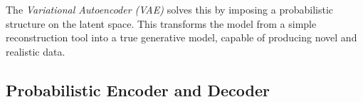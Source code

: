 
The \emph{Variational Autoencoder (VAE)} \citep{kingma2013auto}  solves this by imposing a probabilistic structure on the latent space. This transforms the model from a simple reconstruction tool into a true generative model, capable of producing novel and realistic data.



\subsection{Probabilistic Encoder and Decoder}

